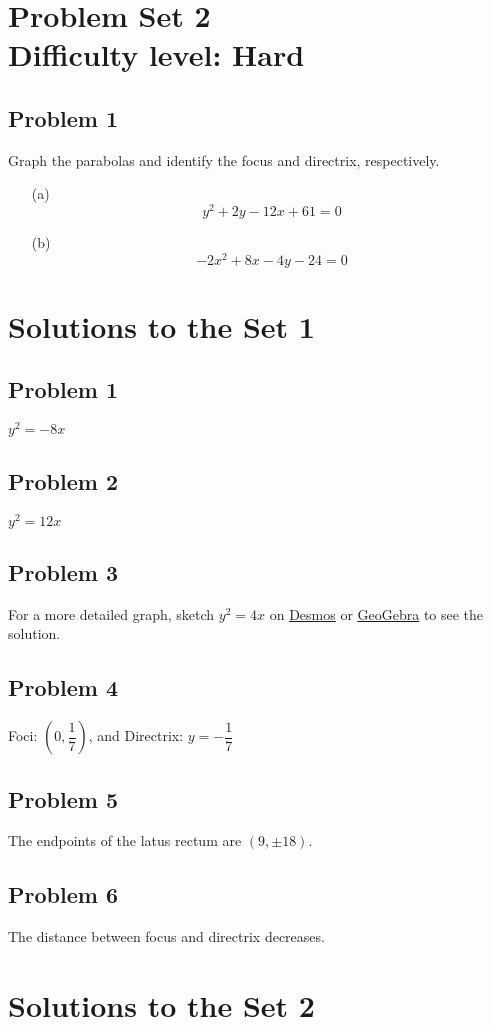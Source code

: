 \documentclass[12pt]{article}
\begin{document}
\section*{Problem Set 2\\Difficulty level: Hard}
\subsection*{Problem 1}
Graph the parabolas and identify the focus and directrix, respectively.
\begin{enumerate}
    \item[(a)] \[y^2+2y-12x+61=0\]
    \item[(b)] \[-2x^2+8x-4y-24=0\]
\end{enumerate}

\newpage
\section*{Solutions to the Set 1}
\subsection*{Problem 1}
\(y^2=-8x\)
\subsection*{Problem 2}
\(y^2=12x\)
\subsection*{Problem 3}
For a more detailed graph, sketch \(y^2=4x\) on \href{https://www.desmos.com/calculator}{Desmos} or \href{https://www.geogebra.org/graphing?lang=en}{GeoGebra} to see the solution.
\subsection*{Problem 4}
Foci: \((0,\dfrac{1}{7})\), and Directrix: \(y=-\dfrac{1}{7}\)
\subsection*{Problem 5}
The endpoints of the latus rectum are \((9, \pm 18)\).
\subsection*{Problem 6}
The distance between focus and directrix decreases.

\section*{Solutions to the Set 2}
\end{document}
